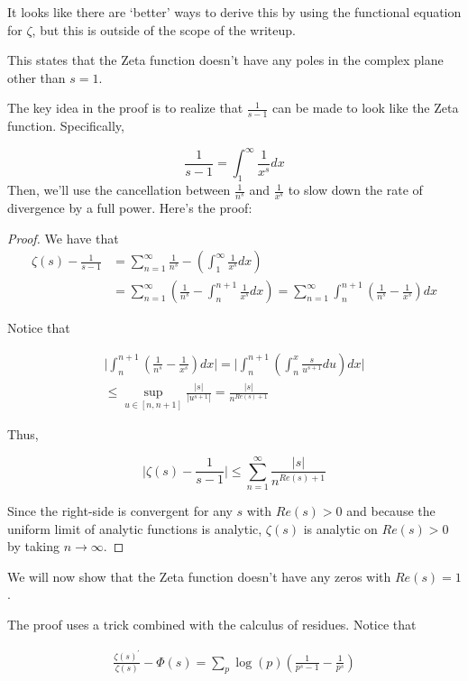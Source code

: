 \documentclass{article}
\theoremstyle{definition}
\begin{document}
It looks like there are `better' ways to derive this by using the functional equation
for $ \zeta $, but this is outside of the scope of the writeup.

This states that the Zeta function doesn't have any poles in the complex plane
other than $ s = 1 $.

The key idea in the proof is to realize that $ \frac{1}{s - 1} $
can be made to look like the Zeta function. Specifically,

\[ \frac{1}{s-1} = \int_{1}^{\infty} \frac{1}{x^{s}} dx\]
Then, we'll use the cancellation between $ \frac{1}{n^{s}} $ and
$ \frac{1}{x^{s}} $ to slow down the rate of divergence by a full power.
Here's the proof:

\begin{proof}
    We have that
    \begin{align*}
        \zeta(s) - \frac{1}{s - 1} &= \sum_{n = 1}^{\infty} \frac{1}{n^{s}} - (\int_{1}^{\infty} \frac{1}{x^{s}} dx) \\
        &= \sum_{n = 1}^{\infty} (\frac{1}{n^{s}} - \int_{n}^{n + 1} \frac{1}{x^{s}} dx) = \sum_{n = 1}^{\infty} \int_{n}^{n+1} (\frac{1}{n^{s}} - \frac{1}{x^{s}}) dx
    \end{align*}

    Notice that

    \begin{align*}
        \lvert \int_{n}^{n+1} (\frac{1}{n^{s}} - \frac{1}{x^{s}}) dx \rvert = \lvert \int_{n}^{n+1} (\int_{n}^{x} \frac{s}{u^{s+1}} du) dx \rvert \\
        \leq \sup_{u \in [n,n+1]} \frac{\lvert s \rvert}{\lvert u^{s+1} \rvert} = \frac{\lvert s \rvert}{n^{Re(s) + 1}}
    \end{align*} 

    Thus, 

    \[ \lvert \zeta(s) - \frac{1}{s - 1} \rvert \leq \sum_{n = 1}^{\infty} \frac{\lvert s \rvert}{n^{Re(s) + 1}} \]

    Since the right-side is convergent for any $ s $ with $ Re(s) > 0 $ and because
    the uniform limit of analytic functions is analytic, $ \zeta(s) $ is analytic on $ Re(s) > 0 $
    by taking $ n \to \infty $.
\end{proof}

We will now show that the Zeta function doesn't have any zeros with $ Re(s) = 1 $.

The proof uses a trick combined with the calculus of residues. Notice that

\begin{align*}
    \frac{\zeta(s)^{\prime}}{\zeta(s)} - \Phi(s) = \sum_{p} \log(p) (\frac{1}{p^{s} - 1} - \frac{1}{p^{s}}) 
\end{align*}
    
\end{document}
